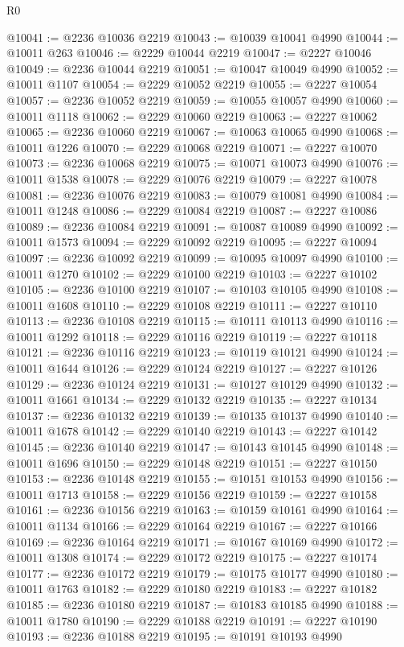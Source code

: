 \begin{lexlean}{R0}
\begin{coremodule}
@10041 := @2236 @10036 @2219
@10043 := @10039 @10041 @4990
@10044 := @10011 @263
@10046 := @2229 @10044 @2219
@10047 := @2227 @10046
@10049 := @2236 @10044 @2219
@10051 := @10047 @10049 @4990
@10052 := @10011 @1107
@10054 := @2229 @10052 @2219
@10055 := @2227 @10054
@10057 := @2236 @10052 @2219
@10059 := @10055 @10057 @4990
@10060 := @10011 @1118
@10062 := @2229 @10060 @2219
@10063 := @2227 @10062
@10065 := @2236 @10060 @2219
@10067 := @10063 @10065 @4990
@10068 := @10011 @1226
@10070 := @2229 @10068 @2219
@10071 := @2227 @10070
@10073 := @2236 @10068 @2219
@10075 := @10071 @10073 @4990
@10076 := @10011 @1538
@10078 := @2229 @10076 @2219
@10079 := @2227 @10078
@10081 := @2236 @10076 @2219
@10083 := @10079 @10081 @4990
@10084 := @10011 @1248
@10086 := @2229 @10084 @2219
@10087 := @2227 @10086
@10089 := @2236 @10084 @2219
@10091 := @10087 @10089 @4990
@10092 := @10011 @1573
@10094 := @2229 @10092 @2219
@10095 := @2227 @10094
@10097 := @2236 @10092 @2219
@10099 := @10095 @10097 @4990
@10100 := @10011 @1270
@10102 := @2229 @10100 @2219
@10103 := @2227 @10102
@10105 := @2236 @10100 @2219
@10107 := @10103 @10105 @4990
@10108 := @10011 @1608
@10110 := @2229 @10108 @2219
@10111 := @2227 @10110
@10113 := @2236 @10108 @2219
@10115 := @10111 @10113 @4990
@10116 := @10011 @1292
@10118 := @2229 @10116 @2219
@10119 := @2227 @10118
@10121 := @2236 @10116 @2219
@10123 := @10119 @10121 @4990
@10124 := @10011 @1644
@10126 := @2229 @10124 @2219
@10127 := @2227 @10126
@10129 := @2236 @10124 @2219
@10131 := @10127 @10129 @4990
@10132 := @10011 @1661
@10134 := @2229 @10132 @2219
@10135 := @2227 @10134
@10137 := @2236 @10132 @2219
@10139 := @10135 @10137 @4990
@10140 := @10011 @1678
@10142 := @2229 @10140 @2219
@10143 := @2227 @10142
@10145 := @2236 @10140 @2219
@10147 := @10143 @10145 @4990
@10148 := @10011 @1696
@10150 := @2229 @10148 @2219
@10151 := @2227 @10150
@10153 := @2236 @10148 @2219
@10155 := @10151 @10153 @4990
@10156 := @10011 @1713
@10158 := @2229 @10156 @2219
@10159 := @2227 @10158
@10161 := @2236 @10156 @2219
@10163 := @10159 @10161 @4990
@10164 := @10011 @1134
@10166 := @2229 @10164 @2219
@10167 := @2227 @10166
@10169 := @2236 @10164 @2219
@10171 := @10167 @10169 @4990
@10172 := @10011 @1308
@10174 := @2229 @10172 @2219
@10175 := @2227 @10174
@10177 := @2236 @10172 @2219
@10179 := @10175 @10177 @4990
@10180 := @10011 @1763
@10182 := @2229 @10180 @2219
@10183 := @2227 @10182
@10185 := @2236 @10180 @2219
@10187 := @10183 @10185 @4990
@10188 := @10011 @1780
@10190 := @2229 @10188 @2219
@10191 := @2227 @10190
@10193 := @2236 @10188 @2219
@10195 := @10191 @10193 @4990

\end{coremodule}
\end{lexlean}
